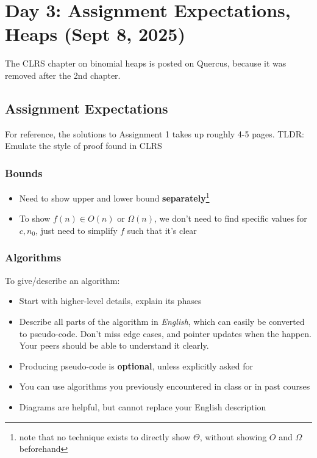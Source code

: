 \section{Day 3: Assignment Expectations, Heaps (Sept 8, 2025)}

The CLRS chapter on binomial heaps is posted on Quercus, because it was removed after the 2nd chapter.


\subsection{Assignment Expectations}

For reference, the solutions to Assignment 1 takes up roughly 4-5 pages. TLDR: Emulate the style of proof found in CLRS

\subsubsection*{Bounds}
\begin{itemize}
    \item Need to show upper and lower bound \textbf{separately}\footnote{note that no technique exists to directly show $\Theta$, without showing $O$ and $\Omega$ beforehand}
    \item To show $f(n) \in O(n)$ or $\Omega(n)$, we don't need to find specific values for $c, n_0$, just need to simplify $f$ such that it's clear 
\end{itemize}

\subsubsection*{Algorithms}
To give/describe an algorithm:
\begin{itemize}
\item Start with higher-level details, explain its phases
    \item Describe all parts of the algorithm in \textit{English}, which can easily be converted to pseudo-code. Don't miss edge cases, and pointer updates when the happen. Your peers should be able to understand it clearly.
    \item Producing pseudo-code is \textbf{optional}, unless explicitly asked for
    \item You can use algorithms you previously encountered in class or in past courses
    \item Diagrams are helpful, but cannot replace your English description
\end{itemize}

